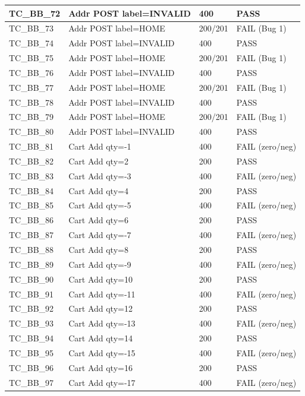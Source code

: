 \documentclass{article}
\begin{document}
\begin{longtable}{|p{2cm}|p{8cm}|p{3cm}|p{2cm}|}
\hline
TC\_BB\_72 & Addr POST label=INVALID & 400 & PASS \\
\hline
TC\_BB\_73 & Addr POST label=HOME & 200/201 & FAIL (Bug 1) \\
\hline
TC\_BB\_74 & Addr POST label=INVALID & 400 & PASS \\
\hline
TC\_BB\_75 & Addr POST label=HOME & 200/201 & FAIL (Bug 1) \\
\hline
TC\_BB\_76 & Addr POST label=INVALID & 400 & PASS \\
\hline
TC\_BB\_77 & Addr POST label=HOME & 200/201 & FAIL (Bug 1) \\
\hline
TC\_BB\_78 & Addr POST label=INVALID & 400 & PASS \\
\hline
TC\_BB\_79 & Addr POST label=HOME & 200/201 & FAIL (Bug 1) \\
\hline
TC\_BB\_80 & Addr POST label=INVALID & 400 & PASS \\
\hline
TC\_BB\_81 & Cart Add qty=-1 & 400 & FAIL (zero/neg) \\
\hline
TC\_BB\_82 & Cart Add qty=2 & 200 & PASS \\
\hline
TC\_BB\_83 & Cart Add qty=-3 & 400 & FAIL (zero/neg) \\
\hline
TC\_BB\_84 & Cart Add qty=4 & 200 & PASS \\
\hline
TC\_BB\_85 & Cart Add qty=-5 & 400 & FAIL (zero/neg) \\
\hline
TC\_BB\_86 & Cart Add qty=6 & 200 & PASS \\
\hline
TC\_BB\_87 & Cart Add qty=-7 & 400 & FAIL (zero/neg) \\
\hline
TC\_BB\_88 & Cart Add qty=8 & 200 & PASS \\
\hline
TC\_BB\_89 & Cart Add qty=-9 & 400 & FAIL (zero/neg) \\
\hline
TC\_BB\_90 & Cart Add qty=10 & 200 & PASS \\
\hline
TC\_BB\_91 & Cart Add qty=-11 & 400 & FAIL (zero/neg) \\
\hline
TC\_BB\_92 & Cart Add qty=12 & 200 & PASS \\
\hline
TC\_BB\_93 & Cart Add qty=-13 & 400 & FAIL (zero/neg) \\
\hline
TC\_BB\_94 & Cart Add qty=14 & 200 & PASS \\
\hline
TC\_BB\_95 & Cart Add qty=-15 & 400 & FAIL (zero/neg) \\
\hline
TC\_BB\_96 & Cart Add qty=16 & 200 & PASS \\
\hline
TC\_BB\_97 & Cart Add qty=-17 & 400 & FAIL (zero/neg) \\
\hline

\end{longtable}
\end{document}
